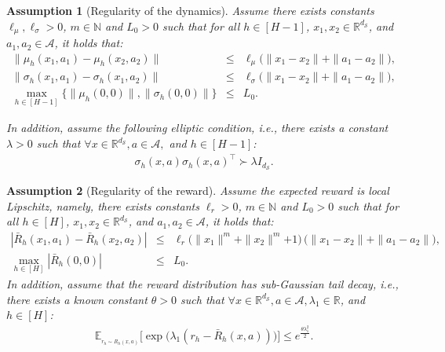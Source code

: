 \documentclass[10pt,a4paper]{amsart}
\newtheorem{assumption}{Assumption}
\begin{document}
\begin{assumption}[Regularity of the dynamics]\label{ass:lipschitz}
Assume there exists constants $\ell_{\mu},\ell_{\sigma}>0$,  $m\in \mathbb{N}$ and $L_{0}> 0$ such that for all $h\in [H-1]$, $x_1,x_2 \in \mathbb{R}^{d_{\mathcal{S}}}$, and $a_1,a_2\in \mathcal{A}$, it holds that:
    \begin{eqnarray*}
        \|\mu_h(x_1,a_1)-\mu_h(x_2,a_2)\|&\leq&\ell_{\mu}\Big(\|x_1-x_2\|+\|a_1-a_2\|\Big),\nonumber\\
        \|\sigma_h(x_1,a_1)-\sigma_h(x_1,a_2)\|&\leq& \ell_{\sigma}\Big(\|x_1-x_2\|+\|a_1-a_2\|\Big),\nonumber\\
          \max_{h\in[H-1]}\{\|\mu_{h}(0,0)\|,\|\sigma_{h}(0,0)\|\}&\leq& L_{0}. 
    \end{eqnarray*} 

In addition, assume the following elliptic condition, i.e., there exists a  constant $\lambda>0$ such that $\forall x \in \mathbb{R}^{d_{\mathcal{S}}}, a \in \mathcal{A},$ and $  h \in [H-1]$:
\begin{eqnarray}\label{ass-eqn:volatility}
    \sigma_{h}(x,a)\sigma_{h}(x,a)^{\top}\succ \lambda I_{d_{\mathcal{S}}}.
\end{eqnarray}
\end{assumption}

\begin{assumption}[Regularity of the reward]\label{ass:expected reward local lipschitz}
Assume the expected reward is local Lipschitz, namely,  there exists  constants $\ell_{r}>0$, $m\in \mathbb{N}$ and $L_{0}> 0$ such that for all $h\in [H]$, $ x_1,x_2 \in \mathbb{R}^{d_{\mathcal{S}}}$, and $ a_1,a_2\in \mathcal{A}$, it holds that:
    \begin{eqnarray*}
    |\bar{R}_{h}(x_1,a_1)-\bar{R}_{h}(x_2,a_2)|&\leq&
{\ell_{r}\Big(\|x_1\|^m+\|x_2\|^m{+1}\Big)\,\Big(\|x_1-x_2\|+\|a_1-a_2\|\Big)},\nonumber\\
     \max_{h\in[H]}|\bar{R}_{h}(0,0)|&\leq&L_{0}.\label{ass-eqn:expected reward local lipschitz}
     \end{eqnarray*}
 In addition, assume that the reward distribution has sub-Gaussian tail decay, i.e., there exists a known constant $\theta>0$ such that $\forall x \in \mathbb{R}^{d_{\mathcal{S}}}, a \in \mathcal{A}, \lambda_{1} \in \mathbb{R}$, and $h \in [H]$:
 \begin{eqnarray}\label{ass-eqn:subGaussian reward}
    \mathbb{E}_{_{r_h\sim R_h(x,a)}}\Big[\exp\Big(\lambda_{1}(r_{h}-\bar{R}_{h}(x,a))\Big)\Big]\leq e^{\frac{\theta \lambda_{1}^2}{2}}.
\end{eqnarray}
\end{assumption}
\end{document}
